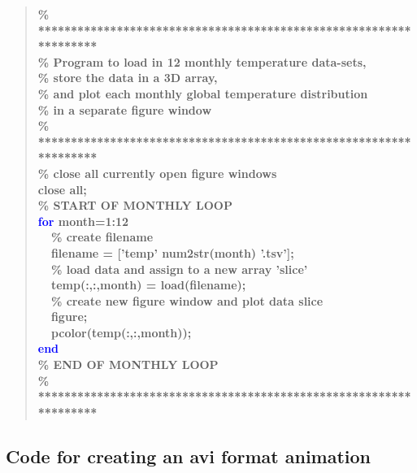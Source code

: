 \documentclass{tufte-book} %
\newenvironment{docspecbold}{\begin{quotation}\ttfamily\bfseries\parskip0pt\parindent0pt\ignorespaces}{\end{quotation}}
\begin{document}
\begin{docspecbold}
\textcolor[rgb]{0,0.501961,0}{\% ****************************************************************** 
\\\% Program to load in 12 monthly temperature data-sets,
\\\% store the data in a 3D array,
\\\% and plot each monthly global temperature distribution
\\\% in a separate figure window
\\\% ****************************************************************** 
\\\% close all currently open figure windows}
\\close \textcolor[rgb]{1,0,1}{all};
\\\textcolor[rgb]{0,0.501961,0}{\% START OF MONTHLY LOOP}
\\\textcolor{blue}{for} month=1:12
\\ \ \ \textcolor[rgb]{0,0.501961,0}{\% create filename}
\\ \ \ filename = [\textcolor[rgb]{1,0,1}{'temp'} num2str(month) \textcolor[rgb]{1,0,1}{'.tsv'}];
\\ \ \ \textcolor[rgb]{0,0.501961,0}{\% load data and assign to a new array 'slice'}
\\ \ \ temp(:,:,month) = load(filename);
\\ \ \ \textcolor[rgb]{0,0.501961,0}{\% create new figure window and plot data slice}
\\ \ \ figure;
\\ \ \ pcolor(temp(:,:,month));
\\\textcolor{blue}{end}
\textcolor[rgb]{0,0.501961,0}{\\\% END OF MONTHLY LOOP
\\\% ****************************************************************** }
\end{docspecbold}

\newpage 

\subsection*{Code for creating an avi format animation}
\end{document}
